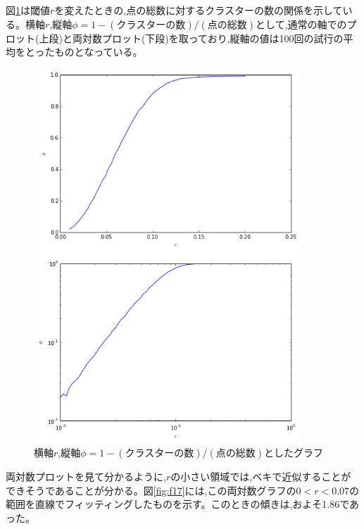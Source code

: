 図\ref{fig:f16}は閾値$r$を変えたときの,点の総数に対するクラスターの数の関係を示している。横軸$r$,縦軸$\phi = 1- (\text{クラスターの数})/(\text{点の総数})$として,通常の軸でのプロット(上段)と両対数プロット(下段)を取っており,縦軸の値は100回の試行の平均をとったものとなっている。
\begin{figure}[H]
    \begin{center}
        \includegraphics[width=10cm]{../img/r_phi_1.png}
        \caption{横軸$r$,縦軸$\phi = 1- (\text{クラスターの数})/(\text{点の総数})$としたグラフ}
        \label{fig:f16}
    \end{center}
\end{figure}
両対数プロットを見て分かるように,$r$の小さい領域では,ベキで近似することができそうであることが分かる。図\ref{fig:f17}には,この両対数グラフの$0<r<0.07$の範囲を直線でフィッティングしたものを示す。このときの傾きは,およそ1.86であった。
